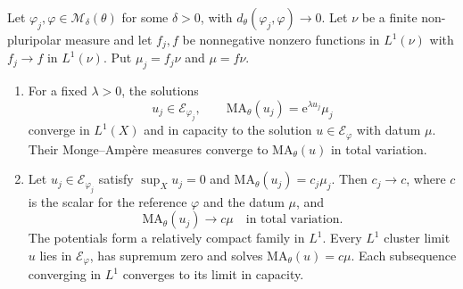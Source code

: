 \begin{theorem}\label{thm:big-varying-equation-stability}
Let $\varphi_j,\varphi\in\mathcal M_\delta(\theta)$ for some $\delta>0$, with $d_\theta(\varphi_j,\varphi)\to0$. Let $\nu$ be a finite non-pluripolar measure and let $f_j,f$ be nonnegative nonzero functions in $L^1(\nu)$ with $f_j\to f$ in $L^1(\nu)$. Put $\mu_j=f_j\nu$ and $\mu=f\nu$.
\begin{enumerate}
\item For a fixed $\lambda>0$, the solutions
\[
 u_j\in\mathcal E_{\varphi_j},\qquad
 \mathrm{MA}_\theta(u_j)=\mathrm{e}^{\lambda u_j}\mu_j
\]
converge in $L^1(X)$ and in capacity to the solution $u\in\mathcal E_\varphi$ with datum $\mu$. Their Monge--Amp\`ere measures converge to $\mathrm{MA}_\theta(u)$ in total variation.
\item Let $u_j\in\mathcal E_{\varphi_j}$ satisfy $\sup_Xu_j=0$ and $\mathrm{MA}_\theta(u_j)=c_j\mu_j$. Then $c_j\to c$, where $c$ is the scalar for the reference $\varphi$ and the datum $\mu$, and
\[
 \mathrm{MA}_\theta(u_j)\longrightarrow c\mu
 \quad\text{in total variation}.
\]
The potentials form a relatively compact family in $L^1$. Every $L^1$ cluster limit $u$ lies in $\mathcal E_\varphi$, has supremum zero and solves $\mathrm{MA}_\theta(u)=c\mu$. Each subsequence converging in $L^1$ converges to its limit in capacity.
\end{enumerate}
\end{theorem}
